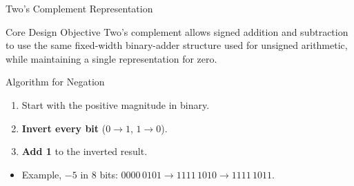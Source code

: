 \documentclass[aspectratio=169,11pt,t]{beamer}
\newcommand{\key}[1]{\textbf{#1}}
\begin{document}
\begin{frame}{Two's Complement Representation}
\begin{block}{Core Design Objective}
Two's complement allows signed addition and subtraction to use the same fixed-width binary-adder structure used for unsigned arithmetic, while maintaining a single representation for zero.
\end{block}
\vspace{0.3em}
\begin{block}{Algorithm for Negation}
\begin{enumerate}
\item Start with the positive magnitude in binary.
\item \key{Invert every bit} ($0 \rightarrow 1$, $1 \rightarrow 0$).
\item \key{Add 1} to the inverted result.
\end{enumerate}
\end{block}
\vspace{0.2em}
\begin{itemize}
\item Example, $-5$ in 8 bits:
$0000\,0101 \rightarrow 1111\,1010 \rightarrow 1111\,1011$.
\end{itemize}
\end{frame}





\end{document}
